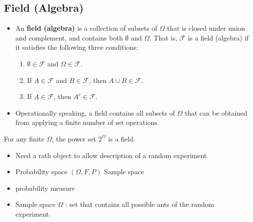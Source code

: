 \subsection{Field (Algebra)}
\begin{itemize}
\item An \textbf{field (algebra)} is a collection of subsets of
  \(\Omega\) that is closed under union and complement, and contains
  both \(\emptyset\) and \(\Omega\). That is, \(\mathcal{F}\) is a
  field (algebra) if it satisfies the following three conditions:
\begin{enumerate}
\item \(\emptyset \in \mathcal{F}\) and \(\Omega \in \mathcal{F}\).
\item If \(A \in \mathcal{F}\) and \(B \in \mathcal{F}\), then \(A \cup B \in \mathcal{F}\). 
\item If \(A \in \mathcal{F}\), then \(A^{c} \in \mathcal{F}\).
\end{enumerate}
  
\item Operationally speaking, a field contains all subsets of
  \(\Omega\) that can be obtained from applying a finite number of set
  operations.
\end{itemize}

\begin{fact}
 For any finite \(\Omega\), the power set \(2^{\Omega}\) is a field.
\end{fact}

\begin{itemize}
  \item[-] Need a rath object to allow description of a random experiment.
  \item[-] Probability space \((\Omega, F, P)\) Sample space
  \item[] probability measure
  \item[-] Sample space \(\Omega\) : set that contains all possible ants of the random experiment.
\end{itemize}
